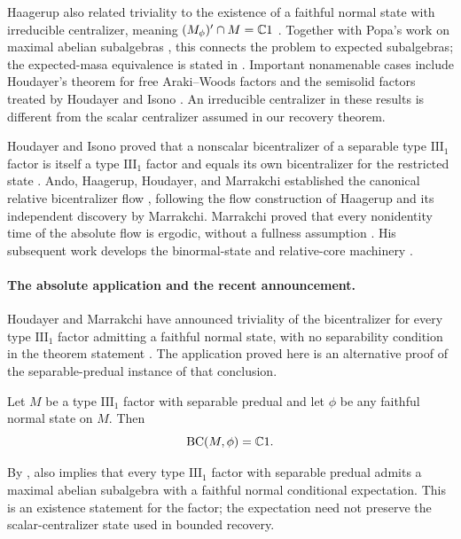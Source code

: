 Haagerup also related triviality to the existence of a faithful normal
state with irreducible centralizer, meaning
$(M_\phi)'\cap M=\mathbb C1$ \cite[Theorem~3.1]{Haagerup1987}.
Together with Popa's work on maximal abelian subalgebras
\cite{Popa1981}, this connects the problem to expected subalgebras;
the expected-masa equivalence is stated in
\cite[Corollary~3.6]{HI2017}.
Important nonamenable cases include Houdayer's theorem for free Araki--Woods factors
\cite{Houdayer2009} and the semisolid factors treated by Houdayer and
Isono \cite[Theorem~3.7]{HI2017}.
An irreducible centralizer in these results is different from the scalar
centralizer assumed in our recovery theorem.

Houdayer and Isono proved that a nonscalar bicentralizer of a separable
type $\mathrm{III}_1$ factor is itself a type $\mathrm{III}_1$ factor
and equals its own bicentralizer for the restricted state
\cite[Proposition~3.4 and Theorem~3.5]{HI2017}.
Ando, Haagerup, Houdayer, and Marrakchi established the canonical relative
bicentralizer flow \cite[Theorem~A]{AHHM2020}, following the flow
construction of Haagerup and its independent discovery by Marrakchi.
Marrakchi proved that every nonidentity time of the absolute flow is
ergodic, without a fullness assumption
\cite[Theorem~D]{Marrakchi2020}. His subsequent work develops the
binormal-state and relative-core machinery
\cite{Marrakchi2025,Marrakchi2026}.

\paragraph{The absolute application and the recent announcement.}
Houdayer and Marrakchi have announced triviality of the bicentralizer
for every type $\mathrm{III}_1$ factor admitting a faithful normal
state, with no separability condition in the theorem statement
\cite[Theorem~G]{HoudayerMarrakchi2026}.
The application proved here is an alternative proof of the
separable-predual instance of that conclusion.

\begin{theorem}\label{thm:main}
Let $M$ be a type $\mathrm{III}_1$ factor with separable predual and let
$\phi$ be any faithful normal state on $M$. Then
\[
  \operatorname{BC}(M,\phi)=\mathbb C1.
\]
\end{theorem}

By \cite[Corollary~3.6]{HI2017},  also implies that every
type $\mathrm{III}_1$ factor with separable predual admits a maximal
abelian subalgebra with a faithful normal conditional expectation.
This is an existence statement for the factor; the expectation need not
preserve the scalar-centralizer state used in bounded recovery.

